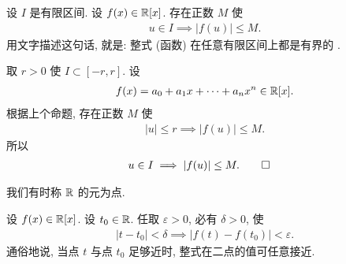 \begin{proposition}
    设 $I$ 是有限区间. 设 $f(x) \in \mathbb{R}[x]$. 存在正数 $M$ 使
    \begin{align*}
        u \in I \implies |f(u)| \leq M.
    \end{align*}
    用文字描述这句话, 就是: 整式 (函数) 在任意有限区间上都是有界的 .
\end{proposition}

\begin{pf}
    取 $r > 0$ 使 $I \subset [-r, r]$. 设
    \begin{align*}
        f(x) = a_0 + a_1 x + \cdots + a_n x^n \in \mathbb{R}[x].
    \end{align*}
    根据上个命题, 存在正数 $M$ 使
    \begin{align*}
        |u| \leq r \implies |f(u)| \leq M.
    \end{align*}
    所以
    \begin{align*}
         & u \in I \implies |f(u)| \leq M. \qedhere
    \end{align*}
\end{pf}

我们有时称 $\mathbb{R}$ 的元为点.

\begin{proposition}
    设 $f(x) \in \mathbb{R}[x]$. 设 $t_0 \in \mathbb{R}$. 任取 $\varepsilon > 0$, 必有 $\delta > 0$, 使
    \begin{align*}
        |t - t_0| < \delta \implies |f(t) - f(t_0)| < \varepsilon.
    \end{align*}
    通俗地说, 当点 $t$ 与点 $t_0$ 足够近时, 整式在二点的值可任意接近.
\end{proposition}

